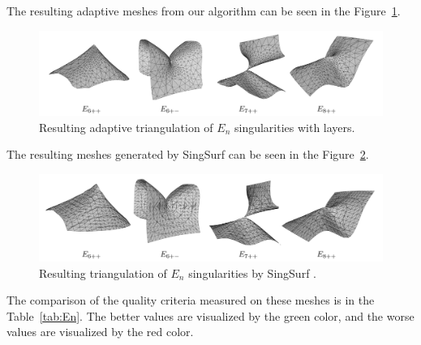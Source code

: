     The resulting adaptive meshes from our algorithm can be seen in the 
    Figure~\ref{img:67}.
    \begin{figure}[h!]
        \centerline{\includegraphics[scale=0.5]{images/img67}}
        \caption[Resulting adaptive triangulation of $E_{n}$ singularities]
        {Resulting adaptive triangulation of $E_{n}$ singularities with layers.}
        \label{img:67}
    \end{figure}

    The resulting meshes generated by SingSurf 
can be seen in the Figure~\ref{img:70}.
\begin{figure}[h!]
    \centerline{\includegraphics[scale=0.5]{images/img70}}
    \caption[Resulting triangulation of $E_{n}$ singularities by SingSurf]
    {Resulting triangulation of $E_{n}$ singularities by SingSurf \cite{morris2003client}.}
    \label{img:70}
\end{figure}

The comparison of the quality criteria measured on these meshes 
is in the Table~\ref{tab:En}. The better values are visualized
by the green color, and the worse values are visualized by the red 
color.


